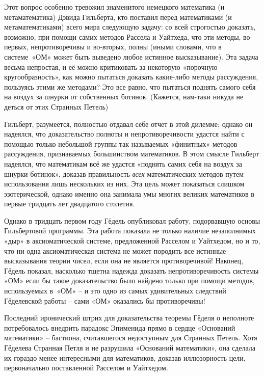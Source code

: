\documentclass[../main.tex]{subfiles}
\begin{document}
Этот вопрос особенно тревожил знаменитого немецкого математика (и метаматематика) Дэвида Гильберта, кто поставил перед математиками (и метаматематиками) всего мира следующую задачу: со всей строгостью доказать, возможно, при помощи самих методов Рассела и Уайтхеда, что эти методы, во-первых, непротиворечивы и во-вторых, полны (иными словами, что в системе~«ОМ» может быть выведено любое истинное высказывание). Эта задача весьма непростая, и её можно критиковать за некоторую «порочную кругообразность», как можно пытаться доказать какие-либо методы рассуждения, пользуясь этими же методами? Это все равно, что пытаться поднять самого себя на воздух за шнурки от собственных ботинок. (Кажется, нам-таки никуда не деться от этих Странных Петель)

Гильберт, разумеется, полностью отдавал себе отчет в этой дилемме; однако он надеялся, что доказательство полноты и непротиворечивости удастся найти с помощью только небольшой группы так называемых «финитных» методов рассуждения, признаваемых большинством математиков. В этом смысле Гильберт надеялся, что математикам всё же удастся «поднять самих себя на воздух за шнурки ботинок», доказав правильность \emph{всех} математических методов путем использования лишь нескольких из них. Эта цель может показаться слишком эзотерической, однако именно она занимала умы многих великих математиков в первые тридцать лет двадцатого столетия.

Однако в тридцать первом году Гёдель опубликовал работу, подорвавшую основы Гильбертовой программы. Эта работа показала не только наличие незаполнимых «дыр» в аксиоматической системе, предложенной Расселом и Уайтхедом, но и то, что ни одна аксиоматическая система не может породить все истинные высказывания теории чисел, если она не является противоречивой! Наконец, Гёдель показал, насколько тщетна надежда доказать непротиворечивость системы «ОМ» если бы такое доказательство было найдено только при помощи методов, используемых в~«ОМ» \--- и это одно из самых удивительных следствий Гёделевской работы \--- сами «ОМ» оказались бы противоречивы!

Последний иронический штрих для доказательства теоремы Гёделя о неполноте потребовалось внедрить парадокс Эпименида прямо в сердце «Оснований математики» \--- бастиона, считавшегося недоступным для Странных Петель. Хотя Гёделева Странная Петля и не разрушила «Оснований математики», она сделала их гораздо менее интересными для математиков, доказав иллюзорность цели, первоначально поставленной Расселом и Уайтхедом.
\end{document}
